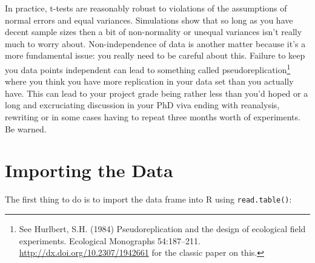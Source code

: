 \documentclass[
]{book}
\newenvironment{Shaded}{\begin{snugshade}}{\end{snugshade}}
\newcommand{\DataTypeTok}[1]{\textcolor[rgb]{0.13,0.29,0.53}{#1}}
\newcommand{\DecValTok}[1]{\textcolor[rgb]{0.00,0.00,0.81}{#1}}
\newcommand{\ErrorTok}[1]{\textcolor[rgb]{0.64,0.00,0.00}{\textbf{#1}}}
\newcommand{\FloatTok}[1]{\textcolor[rgb]{0.00,0.00,0.81}{#1}}
\newcommand{\KeywordTok}[1]{\textcolor[rgb]{0.13,0.29,0.53}{\textbf{#1}}}
\newcommand{\NormalTok}[1]{#1}
\newcommand{\OperatorTok}[1]{\textcolor[rgb]{0.81,0.36,0.00}{\textbf{#1}}}
\newcommand{\OtherTok}[1]{\textcolor[rgb]{0.56,0.35,0.01}{#1}}
\newcommand{\StringTok}[1]{\textcolor[rgb]{0.31,0.60,0.02}{#1}}
\begin{document}
In practice, t-tests are reasonably robust to violations of the assumptions of normal errors and equal variances. Simulations show that so long as you have decent sample sizes then a bit of non-normality or unequal variances isn't really much to worry about. Non-independence of data is another matter because it's a more fundamental issue: you really need to be careful about this. Failure to keep you data points independent can lead to something called pseudoreplication\footnote{See Hurlbert, S.H. (1984) Pseudoreplication and the design of ecological field experiments. Ecological Monographs 54:187--211. \url{http://dx.doi.org/10.2307/1942661} for the classic paper on this.} where you think you have more replication in your data set than you actually have. This can lead to your project grade being rather less than you'd hoped or a long and excruciating discussion in your PhD viva ending with reanalysis, rewriting or in some cases having to repeat three months worth of experiments. Be warned.

\hypertarget{importing-the-data}{%
\section{Importing the Data}\label{importing-the-data}}

The first thing to do is to import the data frame into R using \texttt{read.table()}:

\begin{Shaded}
\end{Shaded}
\end{document}
